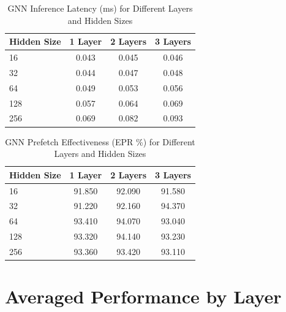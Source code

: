 \documentclass{article}
\begin{document}
\begin{table}[htbp]
    \centering
    \caption{GNN Inference Latency (ms) for Different Layers and Hidden Sizes}
    \label{tab:gnn_latency}
    \begin{tabular}{lccc}
        \toprule
        \textbf{Hidden Size} & \textbf{1 Layer} & \textbf{2 Layers} & \textbf{3 Layers} \\
        \midrule
        16  & 0.043 & 0.045 & 0.046 \\
        32  & 0.044 & 0.047 & 0.048 \\
        64  & 0.049 & 0.053 & 0.056 \\
        128 & 0.057 & 0.064 & 0.069 \\
        256 & 0.069 & 0.082 & 0.093 \\
        \bottomrule
    \end{tabular}
\end{table}

\begin{table}[htbp]
    \centering
    \caption{GNN Prefetch Effectiveness (EPR \%) for Different Layers and Hidden Sizes}
    \label{tab:gnn_pe}
    \begin{tabular}{lccc}
        \toprule
        \textbf{Hidden Size} & \textbf{1 Layer} & \textbf{2 Layers} & \textbf{3 Layers} \\
        \midrule
        16  & 91.850 & 92.090 & 91.580 \\
        32  & 91.220 & 92.160 & 94.370 \\
        64  & 93.410 & 94.070 & 93.040 \\
        128 & 93.320 & 94.140 & 93.230 \\
        256 & 93.360 & 93.420 & 93.110 \\
        \bottomrule
    \end{tabular}
\end{table}

\newpage
\section*{Averaged Performance by Layer}
\end{document}
